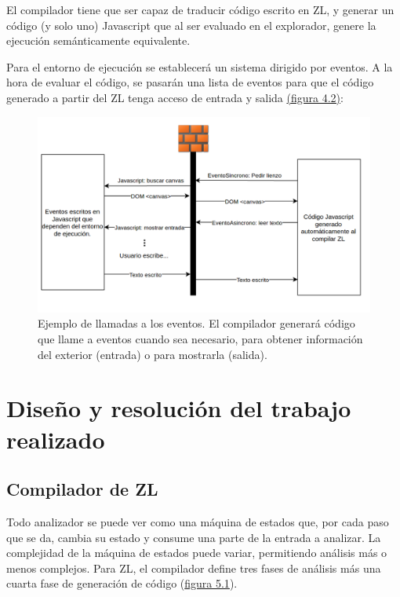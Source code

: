 \documentclass{report}
\begin{document}
	\vspace{10px}
	
	El compilador tiene que ser capaz de traducir código escrito en ZL, y generar un código (y solo uno) Javascript que al ser evaluado en el explorador, genere la ejecución semánticamente equivalente. 

	\vspace{10px}
	
	Para el entorno de ejecución se establecerá un sistema dirigido por eventos. A la hora de evaluar el código, se pasarán una lista de eventos para que el código generado a partir del ZL tenga acceso de entrada y salida \hyperref[fig:diagramaeventos]{(figura 4.2)}:

\begin{figure}
\centering
\includegraphics[width=1\linewidth]{diagramaeventos}
\caption[Diagrama de ejemplo de intercambios usando eventos.]{Ejemplo de llamadas a los eventos. El compilador generará código que llame a eventos cuando sea necesario, para obtener información del exterior (entrada) o para mostrarla (salida).}
\label{fig:diagramaeventos}
\end{figure}

	\chapter{Diseño y resolución del trabajo realizado}
	
	\section{Compilador de ZL}
	
	Todo analizador se puede ver como una máquina de estados que, por cada paso que se da, cambia su estado y consume una parte de la entrada a analizar. La complejidad de la máquina de estados puede variar, permitiendo análisis más o menos complejos. Para ZL, el compilador define tres fases de análisis más una cuarta fase de generación de código (\hyperref[fig:fasesanalisis]{figura 5.1}).
		
\end{document}
